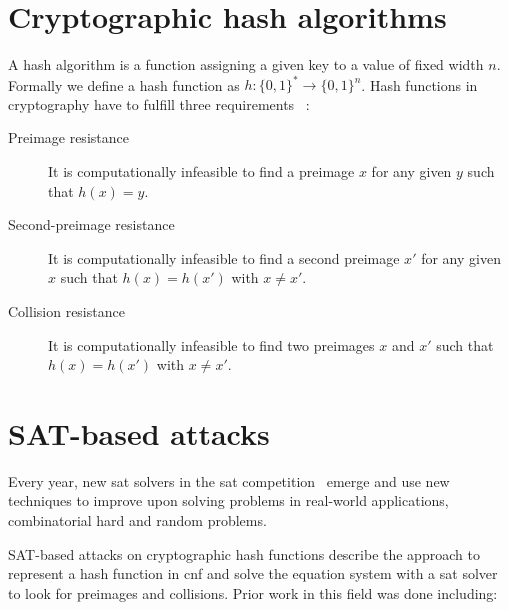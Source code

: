 \section{Cryptographic hash algorithms}
\label{sec:hashalgs}
%
A hash algorithm is a function assigning a given key to a value of fixed width $n$. Formally we define a hash function as $h: \{0, 1\}^* \rightarrow \{0, 1\}^n$. Hash functions in cryptography have to fulfill three requirements%
~\cite[2]{Cry02}:
%
\begin{description}
  \item[Preimage resistance] It is computationally infeasible to find a preimage
    $x$ for any given $y$ such that $h(x) = y$.
  \item[Second-preimage resistance] It is computationally infeasible to find a
    second preimage $x'$ for any given $x$ such that $h(x) = h(x')$ with $x \neq x'$.
  \item[Collision resistance] It is computationally infeasible to find two preimages
    $x$ and $x'$ such that $h(x) = h(x')$ with $x \neq x'$.
\end{description}

\section{SAT-based attacks}
\label{sec:sat_attacks}
%
Every year, new \gls{sat} solvers in the \gls{sat} competition~\cite{Sat21} emerge and use new techniques to improve upon solving problems in real-world applications, combinatorial hard and random problems.

SAT-based attacks on cryptographic hash functions describe the approach to represent a hash function in \gls{cnf} and solve the equation system with a \gls{sat} solver to look for preimages and collisions. Prior work in this field was done including:


